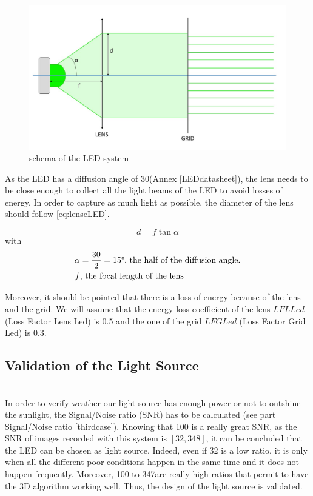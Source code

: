 \begin{figure}[h]
  \centerline{\includegraphics[scale=0.4]{fig/LEDsystem.jpg}}
  \caption{schema of the LED system}
  \label{fig:LEDsystem}
\end{figure}

As the LED has a diffusion angle of 30\textdegree (Annex \ref{LEDdatasheet}), the lens needs to be close enough to collect all the light beams of the LED to avoid losses of energy. In order to capture as much light as possible, the diameter of the lens should follow \eqref{eq:lenseLED}.

\begin{equation}
\label{eq:lenseLED}
d = f \tan \alpha
\end{equation}
with 
\begin{align*}
\alpha & = \frac{30}{2} = 15\mbox{\textdegree, the half of the diffusion angle.}\\
f & \mbox{, the focal length of the lens}
\end{align*}

Moreover, it should be pointed that there is a loss of energy because of the lens and the grid. We will assume that the energy loss coefficient of the lens $LFLLed$ (Loss Factor Lens Led) is 0.5 and the one of the grid $LFGLed$ (Loss Factor Grid Led) is 0.3.

\subsection{Validation of the Light Source}
\label{light Power}
~\\
In order to verify weather our light source has enough power or not to outshine the sunlight, the Signal/Noise ratio (SNR) has to be calculated (see part Signal/Noise ratio \ref{thirdcase}). Knowing that 100 is a really great SNR, as the SNR of images recorded with this system is $[32, 348]$, it can be concluded that the LED can be chosen as light source. Indeed, even if 32 is a low ratio, it is only when all the different poor conditions happen in the same time and it does not happen frequently. Moreover, 100 to 347are really high ratios that permit to have the 3D algorithm working well. Thus, the design of the light source is validated.




